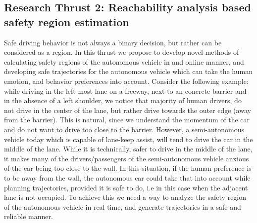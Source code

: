 
\subsection{Research Thrust 2: Reachability analysis based safety region estimation}
\label{sec:reachability}




Safe driving behavior is not always a binary decision, but rather can be considered as a region. 
In this thrust we propose to develop novel methods of calculating safety regions of the autonomous vehicle in and online manner, and developing safe trajectories for the autonomous vehicle which can take the human emotion, and behavior preferences into account. 
Consider the following example: while driving in the left most lane on a freeway, next to an concrete barrier and in the absence of a left shoulder, we notice that majority of human drivers, do not drive in the center of the lane, but rather drive towards the outer edge (away from the barrier). This is natural, since we understand the momentum of the car and do not want to drive too close to the barrier. However, a semi-autonomous vehicle today which is capable of lane-keep assist, will tend to drive the car in the middle of the lane. While it is technically, safer to drive in the middle of the lane, it makes many of the drivers/passengers of the semi-autonomous vehicle anxious of the car being too close to the wall. In this situation, if the human preference is to be away from the wall, the autonomous car could take that into account while planning trajectories, provided it is safe to do, i.e in this case when the adjacent lane is not occupied. 
To achieve this we need a way to analyze the safety region of the autonomous vehicle in real time, and generate trajectories in a safe and reliable manner. 

